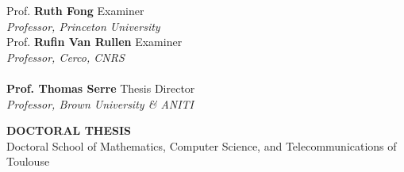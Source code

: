 \begin{center}
\begin{minipage}{0.99\linewidth}
\begin{tabbing}
        Prof. \textbf{Ruth Fong} \> Examiner\\
        \textit{\textcolor{poste_color}{Professor, Princeton University}} \\[0.5em]
        
        Prof. \textbf{Rufin Van Rullen} \> Examiner\\
        \textit{\textcolor{poste_color}{Professor, Cerco, CNRS}} \\[0.5em]

        \\
        
        \textbf{Prof. Thomas Serre} \> Thesis Director\\
        \textit{\textcolor{poste_color}{Professor, Brown University \& ANITI}} \\[0.5em]
    \end{tabbing}

    \vspace{1.5cm}
    
    {\Large\textbf{DOCTORAL THESIS}\\[0.5em]}
    {\large Doctoral School of Mathematics, Computer Science, and Telecommunications of Toulouse}\\[2em]
    
\end{minipage}
\end{center}

